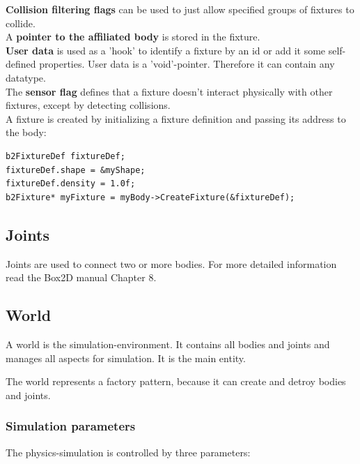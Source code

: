 \documentclass[10pt,a4paper,DIV=11]{scrreprt}
\begin{document}
\textbf{Collision filtering flags} can be used to just allow specified groups of fixtures to collide. \\

A \textbf{pointer to the affiliated body} is stored in the fixture.\\

\textbf{User data} is used as a 'hook' to identify a fixture by an id or add it some self-defined properties. User data is a 'void'-pointer. Therefore it can contain any datatype. \\

The \textbf{sensor flag} defines that a fixture doesn't interact physically with other fixtures, except by detecting collisions. \\



A fixture is created by initializing a fixture definition and passing its address to the body:

\begin{lstlisting}[caption={Creation of a fixture \cite{box}},label=lst:fixture-create]
b2FixtureDef fixtureDef;
fixtureDef.shape = &myShape;
fixtureDef.density = 1.0f;
b2Fixture* myFixture = myBody->CreateFixture(&fixtureDef);
\end{lstlisting}


\subsection{Joints}
Joints are used to connect two or more bodies. For more detailed information read the Box2D manual Chapter 8.

\subsection{World}
A world is the simulation-environment. It contains all bodies and joints and manages all aspects for simulation. It is the main entity.

The world represents a factory pattern, because it can create and detroy bodies and joints.

\subsubsection*{Simulation parameters}
The physics-simulation is controlled by three parameters: \\

   \\
\\
\end{document}
